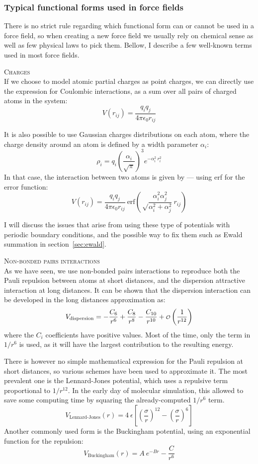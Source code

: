 \documentclass[thesis]{subfiles}
\begin{document}
\subsubsection{Typical functional forms used in force fields}

There is no strict rule regarding which functional form can or cannot be used in
a force field, so when creating a new force field we usually rely on chemical
sense as well as few physical laws to pick them. Bellow, I describe a few
well-known terms used in most force fields.

\textsc{Charges}\\[0.1\baselineskip]
If we choose to model atomic partial charges as point charges, we can directly
use the expression for Coulombic interactions, as a sum over all pairs of
charged atoms in the system:
\[ V(r_{ij}) = \frac{q_i q_j}{4 \pi \epsilon_0 r_{ij}}\]

It is also possible to use Gaussian charges distributions on each atom, where
the charge density around an atom is defined by a width parameter $\alpha_i$:
\[\rho_i = q_i \left(\frac{\alpha_i}{\sqrt\pi}\right)^3 e^{-\alpha_i^2 \ r_i^2}\]
In that case, the interaction between two atoms is given by --- using erf for
the error function:
\[ V(r_{ij}) = \frac{q_i q_j}{4 \pi \epsilon_0 r_{ij}}\ \text{erf}\left(\sqrt\frac{\alpha_i^2\alpha_j^2}{\alpha_i^2 + \alpha_j^2} \ r_{ij}\right)\]

I will discuss the issues that arise from using these type of potentials with
periodic boundary conditions, and the possible way to fix them such as Ewald
summation in section~\ref{sec:ewald}.

\textsc{Non-bonded pairs interactions}\\[0.1\baselineskip]
As we have seen, we use non-bonded pairs interactions to reproduce both the
Pauli repulsion between atoms at short distances, and the dispersion attractive
interaction at long distances. It can be shown\cite{London1930} that the
dispersion interaction can be developed in the long distances approximation as:
\[ V_\text{dispersion} = -\frac{C_6}{r^6} + \frac{C_8}{r^8} - \frac{C_{10}}{r^{10}} + {\scriptstyle\mathcal{O}}\left(\frac{1}{r^{12}}\right) \]
where the $C_i$ coefficients have positive values. Most of the time, only the
term in $1/r^6$ is used, as it will have the largest contribution to the
resulting energy.

There is however no simple mathematical expression for the Pauli repulsion at
short distances, so various schemes have been used to approximate it. The most
prevalent one is the Lennard-Jones potential, which uses a repulsive term
proportional to $1/r^{12}$. In the early day of molecular simulation, this
allowed to save some computing time by squaring the already-computed $1/r^6$
term.
\[V_\text{Lennard-Jones}(r) = 4 \ \epsilon \left[\left(\frac{\sigma}{r}\right)^{12} - \left(\frac{\sigma}{r}\right)^6\right]\]
Another commonly used form is the Buckingham potential, using an exponential
function for the repulsion:
\[V_\text{Buckingham}(r) = A \ e^{-B r} - \frac{C}{r^6}\]
\end{document}
